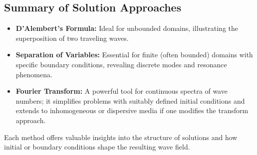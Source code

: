 \documentclass{article}
\begin{document}
\subsection{Summary of Solution Approaches}
\begin{itemize}
    \item \textbf{D'Alembert's Formula:} Ideal for unbounded domains, illustrating the superposition of two traveling waves.
    \item \textbf{Separation of Variables:} Essential for finite (often bounded) domains with specific boundary conditions, revealing discrete modes and resonance phenomena.
    \item \textbf{Fourier Transform:} A powerful tool for continuous spectra of wave numbers; it simplifies problems with suitably defined initial conditions and extends to inhomogeneous or dispersive media if one modifies the transform approach.
\end{itemize}

Each method offers valuable insights into the structure of solutions and how initial or boundary conditions shape the resulting wave field.
\end{document}
